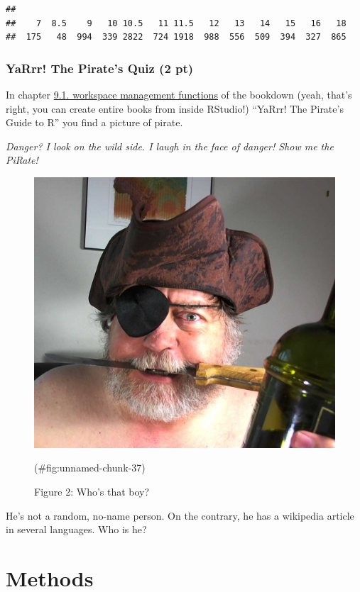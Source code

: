 \documentclass[
]{book}
\newenvironment{Shaded}{\begin{snugshade}}{\end{snugshade}}
\newcommand{\FunctionTok}[1]{\textcolor[rgb]{0.00,0.00,0.00}{#1}}
\newcommand{\NormalTok}[1]{#1}
\newcommand{\SpecialCharTok}[1]{\textcolor[rgb]{0.00,0.00,0.00}{#1}}
\begin{document}
\begin{Shaded}
\end{Shaded}

\begin{verbatim}
## 
##    7  8.5    9   10 10.5   11 11.5   12   13   14   15   16   18 
##  175   48  994  339 2822  724 1918  988  556  509  394  327  865
\end{verbatim}

\hypertarget{yarrr-the-pirates-quiz-2-pt}{%
\subsection{YaRrr! The Pirate's Quiz (2 pt)}\label{yarrr-the-pirates-quiz-2-pt}}

In chapter \href{https://bookdown.org/ndphillips/YaRrr/workspace-management-functions.html}{9.1. workspace management functions} of the bookdown (yeah, that's right, you can create entire books from inside RStudio!) ``YaRrr! The Pirate's Guide to R'' you find a picture of pirate.

\emph{Danger? I look on the wild side. I laugh in the face of danger! Show me the PiRate!}

\begin{figure}

{\centering \includegraphics[width=0.4\linewidth]{images/pirate} 

}

\caption{\label{fig:pirate}Figure 2: Who's that boy?}(\#fig:unnamed-chunk-37)
\end{figure}

He's not a random, no-name person. On the contrary, he has a wikipedia article in several languages. Who is he?

\hypertarget{methods}{%
\chapter{Methods}\label{methods}}
\end{document}
